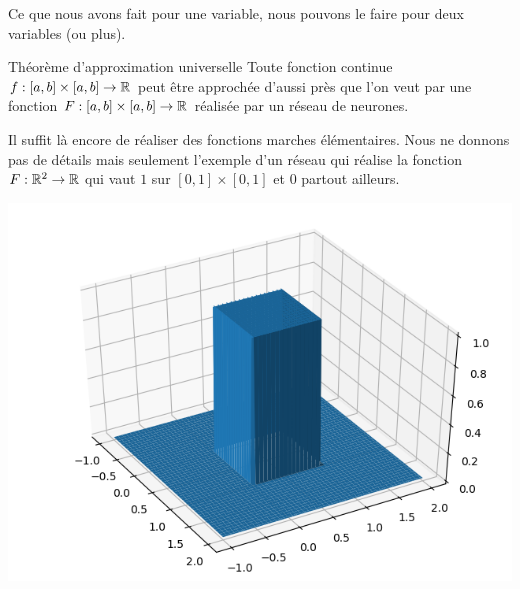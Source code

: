 Ce que nous avons fait pour une variable, nous pouvons le faire pour deux variables (ou plus).

\begin{theoreme}{Théorème d'approximation universelle}{}
	Toute fonction continue $f : [a,b]\times [a,b] \to \mathbb{R}$ peut être approchée d'aussi près que l'on veut par une fonction $F : [a,b]\times [a,b] \to \mathbb{R}$ réalisée par un réseau de neurones.
\end{theoreme}

Il suffit là encore de réaliser des fonctions marches élémentaires. Nous ne donnons pas de détails mais seulement l'exemple d'un réseau qui réalise la fonction
$F : \mathbb{R}^2 \to \mathbb{R}$ qui vaut $1$ sur $[0,1]\times [0,1]$ et $0$ partout ailleurs.





\begin{center}
	\begin{minipage}{0.45\textwidth}
	\end{minipage}
	\begin{minipage}{0.45\textwidth}
		\includegraphics[scale=\myscale,scale=0.5]{figures/neurones-surface-1}
	\end{minipage}
\end{center}



